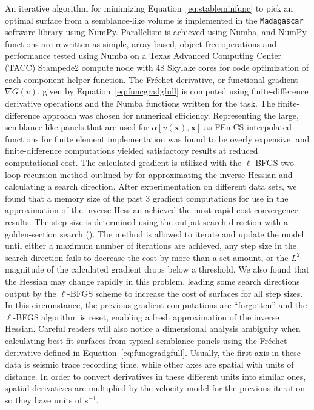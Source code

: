 An iterative algorithm for minimizing Equation~\ref{eq:stableminfunc} to pick an optimal surface from a semblance-like volume  is implemented in the \texttt{Madagascar} software library \cite[]{madagascar} using NumPy. Parallelism is achieved using Numba, and NumPy functions are rewritten as simple, array-based, object-free operations and performance tested using Numba on a Texas Advanced Computing Center (TACC) Stampede2 compute node with 48 Skylake cores for code optimization of each component helper function.  The Fr\'{e}chet derivative, or functional gradient $\nabla \tilde{G}(v)$, given by Equation~\ref{eq:funcgradgfull} is computed using finite-difference derivative operations and the Numba functions written for the task.  The finite-difference approach was chosen for numerical efficiency.  Representing the large, semblance-like panels that are used for $\alpha[v(\mathbf{x}),\mathbf{x}]$ as FEniCS interpolated functions for finite element implementation was found to be overly expensive, and finite-difference computations yielded satisfactory results at reduced computational cost.  The calculated gradient is utilized with the $\ell$-BFGS two-loop recursion method outlined by \cite{nocedal-1980} for approximating the inverse Hessian and calculating a search direction.  After experimentation on different data sets, we found that a memory size of the past 3 gradient computations for use in the approximation of the inverse Hessian achieved the most rapid cost convergence results.  The step size is determined using the output search direction with a golden-section search (\citealp{kiefer-1953,mordecai-1966}). The method is allowed to iterate and update the model until either a maximum number of iterations are achieved, any step size in the search direction fails to decrease the cost by more than a set amount, or the $L^2$ magnitude of the calculated gradient drops below a threshold. We also found that the Hessian may change rapidly in this problem, leading some search directions output by the $\ell$-BFGS scheme to increase the cost of surfaces for all step sizes.  In this circumstance, the previous gradient computations are ``forgotten'' and the $\ell$-BFGS algorithm is reset, enabling a fresh approximation of the inverse Hessian. Careful readers will also notice a dimensional analysis ambiguity when calculating best-fit surfaces from typical semblance panels using the Fr\'{e}chet derivative defined in Equation~\ref{eq:funcgradgfull}.  Usually, the first axis in these data is seismic trace recording time, while other axes are spatial with units of distance.  In order to convert derivatives in these different units into similar ones, spatial derivatives are multiplied by the velocity model for the previous iteration so they have units of s$^{-1}$. 

